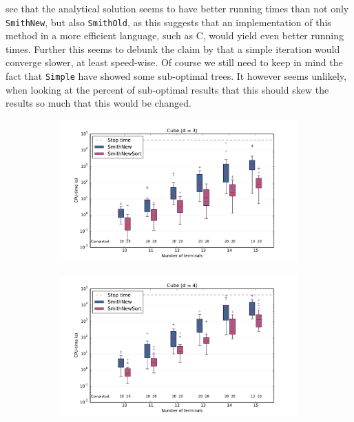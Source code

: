 see that the analytical solution seems to have better running times than not
only \texttt{SmithNew}, but also \texttt{SmithOld}, as this suggests that an
implementation of this method in a more efficient language, such as C, would
yield even better running times. Further this seems to debunk the claim by
\textcite{smith1992} that a simple iteration would converge slower, at least
speed-wise. Of course we still need to keep in mind the fact that
\texttt{Simple} have showed some sub-optimal trees. It however seems unlikely,
when looking at the percent of sub-optimal results that this should skew the
results so much that this would be changed.
% 
\begin{figure}[htbp]
  \centering
  \begin{subfigure}[t]{0.5\textwidth}
    \includegraphics[width=\textwidth]{gfx/boxplots/plot_nvst_boxplot_d3_Cube_2}
  \end{subfigure}%
  \begin{subfigure}[t]{0.5\textwidth}
    \includegraphics[width=\textwidth]{gfx/boxplots/plot_nvst_boxplot_d4_Cube_2}

\end{subfigure}
\end{figure}
